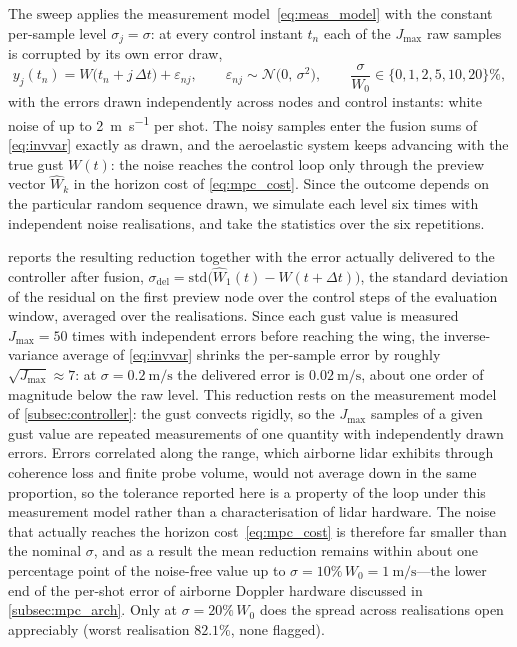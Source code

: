 The
sweep applies
the measurement model~\eqref{eq:meas_model} with the constant per-sample
level $\sigma_j = \sigma$: at every control instant $t_n$ each of the
$J_{\max}$ raw samples is corrupted by its own error draw,
\begin{equation*}
y_j(t_n) = W\bigl(t_n + j\,\Delta t\bigr) + \varepsilon_{nj}, \qquad
\varepsilon_{nj} \sim \mathcal{N}\bigl(0,\,\sigma^2\bigr), \qquad
\frac{\sigma}{W_0} \in \{0, 1, 2, 5, 10, 20\}\%,
\end{equation*}
with the errors drawn independently across nodes and control instants:
white noise of up to \SI{2}{\meter\per\second} per shot. The noisy samples enter the
fusion sums of \cref{eq:invvar} exactly as drawn, and the aeroelastic
system keeps advancing with the true gust $W(t)$: the noise reaches the
control loop only through the preview vector $\widehat{W}_k$ in the
horizon cost of \cref{eq:mpc_cost}. Since the outcome depends on the particular random
sequence drawn, we simulate each level six times with independent noise
realisations, and take the statistics over the six repetitions.

 reports the resulting reduction together with the
error actually delivered to the controller after fusion,
$\sigma_{\mathrm{del}} = \mathrm{std}\bigl(\widehat{W}_1(t) - W(t+\Delta t)\bigr)$,
the standard deviation of the residual on the first preview node over the
control steps of the evaluation window, averaged over the realisations.
Since each gust
value is measured $J_{\max} = 50$ times with independent errors before
reaching the wing, the inverse-variance average of \cref{eq:invvar}
shrinks the per-sample error by roughly $\sqrt{J_{\max}} \approx 7$: at
$\sigma = \SI{0.2}{\meter\per\second}$ the delivered error is $\SI{0.02}{\meter\per\second}$, about one order of
magnitude below the raw level. This reduction rests on the measurement model of
\cref{subsec:controller}: the gust convects rigidly, so the $J_{\max}$ samples of a given
gust value are repeated measurements of one quantity with independently drawn errors. Errors
correlated along the range, which airborne lidar exhibits through coherence loss and finite
probe volume, would not average down in the same proportion, so the tolerance reported here
is a property of the loop under this measurement model rather than a characterisation of
lidar hardware. The noise that actually reaches the horizon
cost~\eqref{eq:mpc_cost} is therefore far smaller than the nominal
$\sigma$, and as a result the mean reduction remains within about one
percentage point of the noise-free value up to $\sigma = 10\%\,W_0 =
\SI{1}{\meter\per\second}$---the lower end of the per-shot error of airborne Doppler hardware
discussed in \cref{subsec:mpc_arch}. Only at $\sigma = 20\%\,W_0$ does the
spread across realisations open appreciably (worst realisation $82.1\%$,
none flagged).

